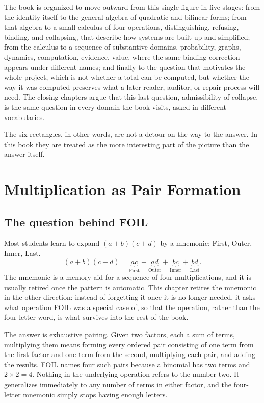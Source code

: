 \documentclass[11pt]{book}
\begin{document}
The book is organized to move outward from this single figure in five stages: from the identity itself to the general algebra of quadratic and bilinear forms; from that algebra to a small calculus of four operations, distinguishing, refusing, binding, and collapsing, that describe how systems are built up and simplified; from the calculus to a sequence of substantive domains, probability, graphs, dynamics, computation, evidence, value, where the same binding correction appears under different names; and finally to the question that motivates the whole project, which is not whether a total can be computed, but whether the way it was computed preserves what a later reader, auditor, or repair process will need. The closing chapters argue that this last question, admissibility of collapse, is the same question in every domain the book visits, asked in different vocabularies.

The six rectangles, in other words, are not a detour on the way to the answer. In this book they are treated as the more interesting part of the picture than the answer itself.

\mainmatter

\chapter{Multiplication as Pair Formation}

\section{The question behind FOIL}

Most students learn to expand $(a+b)(c+d)$ by a mnemonic: First, Outer, Inner, Last.
\[
(a+b)(c+d) = \underbrace{ac}_{\text{First}} + \underbrace{ad}_{\text{Outer}} + \underbrace{bc}_{\text{Inner}} + \underbrace{bd}_{\text{Last}}.
\]
The mnemonic is a memory aid for a sequence of four multiplications, and it is usually retired once the pattern is automatic. This chapter retires the mnemonic in the other direction: instead of forgetting it once it is no longer needed, it asks what operation FOIL was a special case of, so that the operation, rather than the four-letter word, is what survives into the rest of the book.

The answer is exhaustive pairing. Given two factors, each a sum of terms, multiplying them means forming every ordered pair consisting of one term from the first factor and one term from the second, multiplying each pair, and adding the results. FOIL names four such pairs because a binomial has two terms and $2 \times 2 = 4$. Nothing in the underlying operation refers to the number two. It generalizes immediately to any number of terms in either factor, and the four-letter mnemonic simply stops having enough letters.
\end{document}
